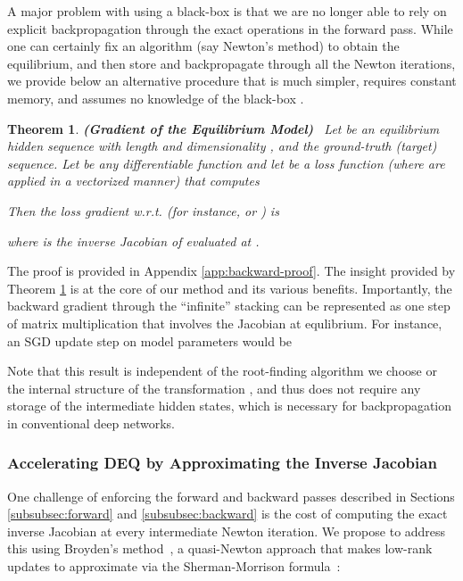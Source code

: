 \documentclass{article}
\newtheorem{theorem}{Theorem}
\begin{document}
A major problem with using a black-box  is that we are no longer able to rely on explicit backpropagation through the exact operations in the forward pass. While one can certainly fix an algorithm (say Newton's method) to obtain the equilibrium, and then store and backpropagate through all the Newton iterations, we provide below an alternative procedure that is much simpler, requires constant memory, and assumes no knowledge of the black-box .

\begin{theorem}
\label{thm:backward}
\textbf{(Gradient of the Equilibrium Model)} \ Let  be an equilibrium hidden sequence with length  and dimensionality , and  the ground-truth (target) sequence. Let  be any differentiable function and let  be a loss function (where  are applied in a vectorized manner) that computes

Then the loss gradient w.r.t.  (for instance,  or ) is

where  is the inverse Jacobian of  evaluated at .
\end{theorem}

The proof is provided in Appendix \ref{app:backward-proof}. The insight provided by Theorem \ref{thm:backward} is at the core of our method and its various benefits. Importantly, the backward gradient through the ``infinite'' stacking can be represented as one step of matrix multiplication that involves the Jacobian at equlibrium. For instance, an SGD update step on model parameters  would be

Note that this result is independent of the root-finding algorithm we choose or the internal structure of the transformation , and thus does not require any storage of the intermediate hidden states, which is necessary for backpropagation in conventional deep networks.

\subsubsection{Accelerating DEQ by Approximating the Inverse Jacobian}
\label{subsubsec:accelerate}

One challenge of enforcing the forward and backward passes described in Sections \ref{subsubsec:forward} and \ref{subsubsec:backward} is the cost of computing the exact inverse Jacobian  at every intermediate Newton iteration. We propose to address this using Broyden's method~\citep{broyden1965class}, a quasi-Newton approach that makes low-rank updates to approximate  via the Sherman-Morrison formula~\citep{sherman1950adjustment}:
\end{document}
